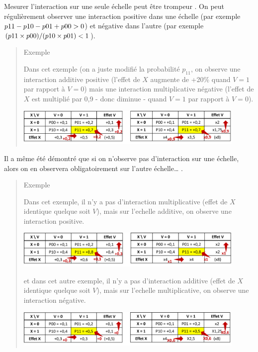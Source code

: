 \documentclass[
]{book}
\begin{document}
Mesurer l'interaction sur une seule échelle peut être trompeur \citet{mathur2018r}. On peut régulièrement observer une interaction positive dans une échelle (par exemple \(\small p11 - p10 - p01 + p00 > 0\)) et négative dans l'autre (par exemple \(\small (p11 \times p00) / (p10 \times p01) <1\)).

\begin{quote}
Exemple

Dans cet exemple (on a juste modifié la probabilité \(p_{11}\), on observe une interaction additive positive (l'effet de \(X\) augmente de +20\% quand \(V=1\) par rapport à \(V=0\)) mais une interaction multiplicative négative (l'effet de \(X\) est multiplié par 0,9 - donc diminue - quand \(V=1\) par rapport à \(V=0\)).

\includegraphics[width=0.9\textwidth,height=\textheight]{img/Image4.png}
\end{quote}

Il a même été démontré que si on n'observe pas d'interaction sur une échelle, alors on en observera obligatoirement sur l'autre échelle\ldots{} \citet{vanderweele_tutorial_2014}.

\begin{quote}
Exemple

Dans cet exemple, il n'y a pas d'interaction multiplicative (effet de \(X\) identique quelque soit \(V\)), mais sur l'echelle additive, on observe une interaction positive.

\includegraphics[width=0.9\textwidth,height=\textheight]{img/Image5.png}

et dans cet autre exemple, il n'y a pas d'interaction additive (effet de \(X\) identique quelque soit \(V\)), mais sur l'echelle multiplicative, on observe une interaction négative.

\includegraphics[width=0.9\textwidth,height=\textheight]{img/Image5b.png}
\end{quote}
\end{document}
